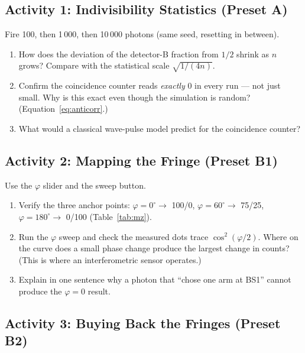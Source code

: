 \documentclass[a4paper,11pt]{article}
\begin{document}
\subsection{Activity 1: Indivisibility Statistics (Preset A)}

\begin{studentbox}
Fire 100, then 1\,000, then 10\,000 photons (same seed, resetting in between).
\begin{enumerate}
    \item How does the deviation of the detector-B fraction from $1/2$ shrink as $n$
          grows? Compare with the statistical scale $\sqrt{1/(4n)}$.
    \item Confirm the coincidence counter reads \emph{exactly} 0 in every run --- not
          just small. Why is this exact even though the simulation is random?
          (Equation~\eqref{eq:anticorr}.)
    \item What would a classical wave-pulse model predict for the coincidence
          counter?
\end{enumerate}
\end{studentbox}

\subsection{Activity 2: Mapping the Fringe (Preset B1)}

\begin{studentbox}
Use the $\varphi$ slider and the sweep button.
\begin{enumerate}
    \item Verify the three anchor points: $\varphi = 0^\circ \rightarrow$ 100/0,
          $\varphi = 60^\circ \rightarrow$ 75/25,
          $\varphi = 180^\circ \rightarrow$ 0/100 (Table~\ref{tab:mz}).
    \item Run the $\varphi$ sweep and check the measured dots trace
          $\cos^2(\varphi/2)$. Where on the curve does a small phase change produce
          the largest change in counts? (This is where an interferometric sensor
          operates.)
    \item Explain in one sentence why a photon that ``chose one arm at BS1'' cannot
          produce the $\varphi = 0$ result.
\end{enumerate}
\end{studentbox}

\subsection{Activity 3: Buying Back the Fringes (Preset B2)}
\end{document}
